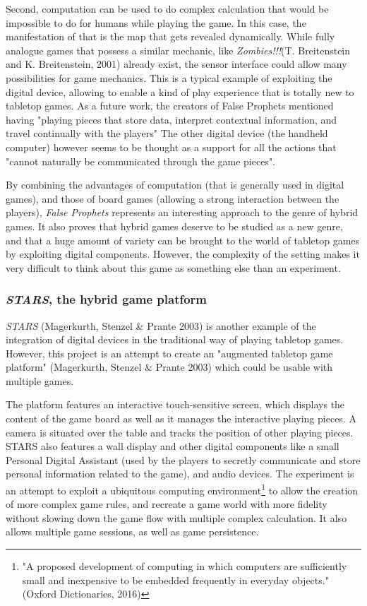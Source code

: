 Second, computation can be used to do complex calculation that would be impossible to do for humans while playing the game. In this case, the manifestation of that is the map that gets revealed dynamically.  While fully analogue games  that possess a similar mechanic, like \textit{Zombies!!!}(T. Breitenstein and K. Breitenstein, 2001)\cite{game:zombies} already exist, the sensor interface could allow many possibilities for game mechanics. This is a typical example of exploiting the digital device, allowing to enable a kind of play experience that is totally new to tabletop games. As a future work, the creators of False Prophets mentioned having "playing pieces that store data, interpret contextual information, and travel continually with the players" The other digital device (the handheld computer) however seems to be thought as a support for all the actions that "cannot naturally be communicated through the game pieces".

By combining the advantages of computation (that is generally used in digital games), and those of board games (allowing a strong interaction between the players), \textit{False Prophets} represents an interesting approach to the genre of hybrid games. It also proves that hybrid games deserve to be studied as a new genre, and that a huge amount of variety can be brought to the world of tabletop games by exploiting digital components. However, the complexity of the setting makes it very difficult to think about this game as something else than an experiment. 
\subsubsection{\textit{STARS}, the hybrid game platform}
\textit{STARS} (Magerkurth, Stenzel \& Prante 2003)\cite{art:stars} is another example of the integration of digital devices in the traditional way of playing tabletop games. However, this project is an attempt to create an "augmented tabletop game platform" (Magerkurth, Stenzel \& Prante 2003) which could be usable with multiple games.

The platform features an interactive touch-sensitive screen, which displays the content of the game board as well as it manages the interactive playing pieces. A camera is situated over the table and tracks the position of other playing pieces. STARS also features a wall display and other digital components like a small Personal Digital Assistant (used by the players to secretly communicate and store personal information related to the game), and audio devices. The experiment is an attempt to exploit a ubiquitous computing environment\footnote{"A proposed development of computing in which computers are sufficiently small and inexpensive to be embedded frequently in everyday objects."(Oxford Dictionaries, 2016)} to allow the creation of more complex game rules, and recreate a game world with more fidelity without slowing down the game flow with multiple complex calculation. It also allows multiple game sessions, as well as game persistence. 

